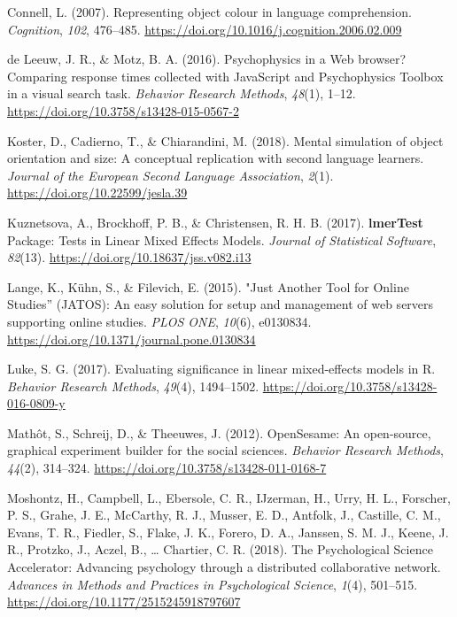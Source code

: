 \documentclass[
  man]{apa6}
\newlength{\cslhangindent}
\newlength{\cslentryspacingunit} %
\newenvironment{CSLReferences}[2] %
 {%
  \setlength{\parindent}{0pt}
  \ifodd #1
  \let\oldpar\par
  \def\par{\hangindent=\cslhangindent\oldpar}
  \fi
  \setlength{\parskip}{#2\cslentryspacingunit}
 }%
 {}
\begin{document}
\begin{CSLReferences}{1}{0}
\leavevmode{}%
Connell, L. (2007). Representing object colour in language comprehension. \emph{Cognition}, \emph{102}, 476--485. \url{https://doi.org/10.1016/j.cognition.2006.02.009}

\leavevmode{}%
de Leeuw, J. R., \& Motz, B. A. (2016). Psychophysics in a {Web} browser? {Comparing} response times collected with {JavaScript} and {Psychophysics Toolbox} in a visual search task. \emph{Behavior Research Methods}, \emph{48}(1), 1--12. \url{https://doi.org/10.3758/s13428-015-0567-2}

\leavevmode{}%
Koster, D., Cadierno, T., \& Chiarandini, M. (2018). Mental simulation of object orientation and size: {A} conceptual replication with second language learners. \emph{Journal of the European Second Language Association}, \emph{2}(1). \url{https://doi.org/10.22599/jesla.39}

\leavevmode{}%
Kuznetsova, A., Brockhoff, P. B., \& Christensen, R. H. B. (2017). {\textbf{lmerTest}} {Package}: {Tests} in {Linear Mixed Effects Models}. \emph{Journal of Statistical Software}, \emph{82}(13). \url{https://doi.org/10.18637/jss.v082.i13}

\leavevmode{}%
Lange, K., Kühn, S., \& Filevich, E. (2015). "{Just Another Tool} for {Online Studies}'' ({JATOS}): {An} easy solution for setup and management of web servers supporting online studies. \emph{PLOS ONE}, \emph{10}(6), e0130834. \url{https://doi.org/10.1371/journal.pone.0130834}

\leavevmode{}%
Luke, S. G. (2017). Evaluating significance in linear mixed-effects models in {R}. \emph{Behavior Research Methods}, \emph{49}(4), 1494--1502. \url{https://doi.org/10.3758/s13428-016-0809-y}

\leavevmode{}%
Mathôt, S., Schreij, D., \& Theeuwes, J. (2012). {OpenSesame}: {An} open-source, graphical experiment builder for the social sciences. \emph{Behavior Research Methods}, \emph{44}(2), 314--324. \url{https://doi.org/10.3758/s13428-011-0168-7}

\leavevmode{}%
Moshontz, H., Campbell, L., Ebersole, C. R., IJzerman, H., Urry, H. L., Forscher, P. S., Grahe, J. E., McCarthy, R. J., Musser, E. D., Antfolk, J., Castille, C. M., Evans, T. R., Fiedler, S., Flake, J. K., Forero, D. A., Janssen, S. M. J., Keene, J. R., Protzko, J., Aczel, B., \ldots{} Chartier, C. R. (2018). The {Psychological Science Accelerator}: {Advancing} psychology through a distributed collaborative network. \emph{Advances in Methods and Practices in Psychological Science}, \emph{1}(4), 501--515. \url{https://doi.org/10.1177/2515245918797607}


\end{CSLReferences}
\end{document}
